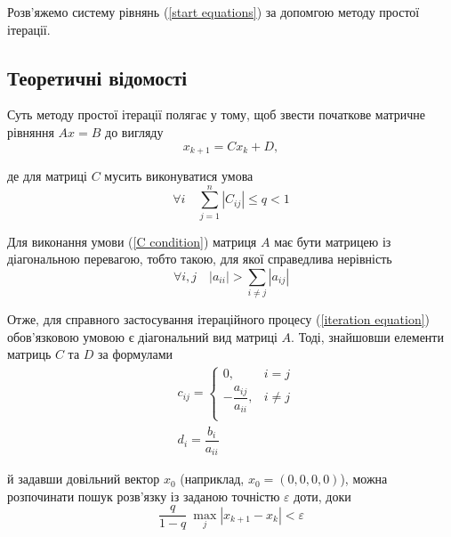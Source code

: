 \documentclass[a4paper,14pt]{extarticle} %
\begin{document}
Розв'яжемо систему рівнянь (\ref{start equations}) за допомгою методу простої ітерації.

\subsection*{Теоретичні відомості}

Суть методу простої ітерації полягає у тому, щоб звести початкове матричне рівняння $Ax=B$ до вигляду 
\begin{equation}
    x_{k+1}=Cx_k+D, \label{iteration equation}
\end{equation} 

де для матриці $C$ мусить виконуватися умова
\begin{equation} 
    \forall i \quad \sum\limits_{j=1}^n |C_{ij}|\leqslant q<1 \label{C condition}
\end{equation}

Для виконання умови (\ref{C condition}) матриця $A$ має бути матрицею із діагональною перевагою, тобто 
такою, для якої справедлива нерівність
\begin{equation} 
    \forall i,j \quad |a_{ii}| > \sum\limits_{i \neq j} |a_{ij}|
\end{equation}

Отже, для справного застосування ітераційного процесу (\ref{iteration equation}) обов'язковою умовою є 
діагональний вид матриці $A$. Тоді, знайшовши елементи матриць $C$ та $D$ за формулами
\begin{align*}
    &c_{ij}=
    \begin{cases}
        0, &i=j \\
        -\dfrac{a_{ij}}{a_{ii}}, &i\neq j \\
    \end{cases} \\ 
    &d_i = \dfrac{b_i}{a_{ii}}
\end{align*}

й задавши довільний вектор $x_0$ (наприклад, $x_0=(0,0,0,0)$), можна розпочинати пошук розв'язку із заданою 
точністю $\varepsilon$ доти, доки
\begin{equation}
    \dfrac{q}{1-q}\ \max\limits_j|x_{k+1}-x_k| < \varepsilon
\end{equation}
\end{document}

